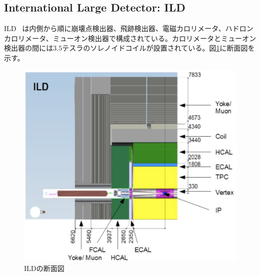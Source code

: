 \subsection{International Large Detector: ILD}
ILD ~\cite{tdr2}は内側から順に崩壊点検出器、飛跡検出器、電磁カロリメータ、ハドロンカロリメータ、ミューオン検出器で構成されている。カロリメータとミューオン検出器の間には$3.5$テスラのソレノイドコイルが設置されている。図\ref{ild}に断面図を示す。
\begin{figure}[H]
	\begin{center}
 \includegraphics[keepaspectratio, scale=0.25]
 	{Figure/Introduction/ild.png}
 		\caption {ILDの断面図~\cite{tdr2}}
 		\label{ild}
	\end{center}
\end{figure}

